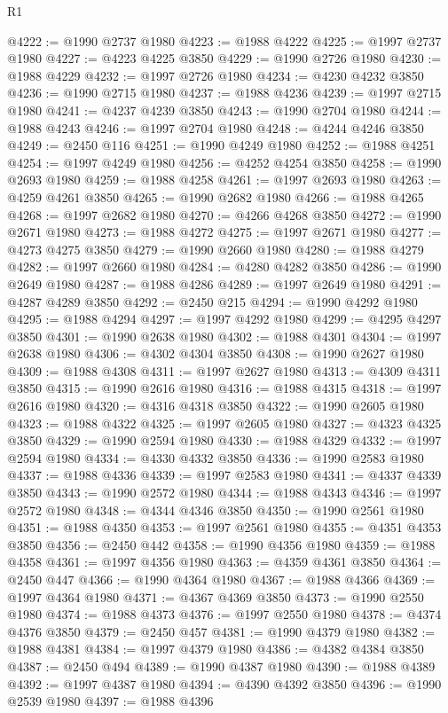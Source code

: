 \begin{lexlean}{R1}
\begin{coremodule}
@4222 := @1990 @2737 @1980
@4223 := @1988 @4222
@4225 := @1997 @2737 @1980
@4227 := @4223 @4225 @3850
@4229 := @1990 @2726 @1980
@4230 := @1988 @4229
@4232 := @1997 @2726 @1980
@4234 := @4230 @4232 @3850
@4236 := @1990 @2715 @1980
@4237 := @1988 @4236
@4239 := @1997 @2715 @1980
@4241 := @4237 @4239 @3850
@4243 := @1990 @2704 @1980
@4244 := @1988 @4243
@4246 := @1997 @2704 @1980
@4248 := @4244 @4246 @3850
@4249 := @2450 @116
@4251 := @1990 @4249 @1980
@4252 := @1988 @4251
@4254 := @1997 @4249 @1980
@4256 := @4252 @4254 @3850
@4258 := @1990 @2693 @1980
@4259 := @1988 @4258
@4261 := @1997 @2693 @1980
@4263 := @4259 @4261 @3850
@4265 := @1990 @2682 @1980
@4266 := @1988 @4265
@4268 := @1997 @2682 @1980
@4270 := @4266 @4268 @3850
@4272 := @1990 @2671 @1980
@4273 := @1988 @4272
@4275 := @1997 @2671 @1980
@4277 := @4273 @4275 @3850
@4279 := @1990 @2660 @1980
@4280 := @1988 @4279
@4282 := @1997 @2660 @1980
@4284 := @4280 @4282 @3850
@4286 := @1990 @2649 @1980
@4287 := @1988 @4286
@4289 := @1997 @2649 @1980
@4291 := @4287 @4289 @3850
@4292 := @2450 @215
@4294 := @1990 @4292 @1980
@4295 := @1988 @4294
@4297 := @1997 @4292 @1980
@4299 := @4295 @4297 @3850
@4301 := @1990 @2638 @1980
@4302 := @1988 @4301
@4304 := @1997 @2638 @1980
@4306 := @4302 @4304 @3850
@4308 := @1990 @2627 @1980
@4309 := @1988 @4308
@4311 := @1997 @2627 @1980
@4313 := @4309 @4311 @3850
@4315 := @1990 @2616 @1980
@4316 := @1988 @4315
@4318 := @1997 @2616 @1980
@4320 := @4316 @4318 @3850
@4322 := @1990 @2605 @1980
@4323 := @1988 @4322
@4325 := @1997 @2605 @1980
@4327 := @4323 @4325 @3850
@4329 := @1990 @2594 @1980
@4330 := @1988 @4329
@4332 := @1997 @2594 @1980
@4334 := @4330 @4332 @3850
@4336 := @1990 @2583 @1980
@4337 := @1988 @4336
@4339 := @1997 @2583 @1980
@4341 := @4337 @4339 @3850
@4343 := @1990 @2572 @1980
@4344 := @1988 @4343
@4346 := @1997 @2572 @1980
@4348 := @4344 @4346 @3850
@4350 := @1990 @2561 @1980
@4351 := @1988 @4350
@4353 := @1997 @2561 @1980
@4355 := @4351 @4353 @3850
@4356 := @2450 @442
@4358 := @1990 @4356 @1980
@4359 := @1988 @4358
@4361 := @1997 @4356 @1980
@4363 := @4359 @4361 @3850
@4364 := @2450 @447
@4366 := @1990 @4364 @1980
@4367 := @1988 @4366
@4369 := @1997 @4364 @1980
@4371 := @4367 @4369 @3850
@4373 := @1990 @2550 @1980
@4374 := @1988 @4373
@4376 := @1997 @2550 @1980
@4378 := @4374 @4376 @3850
@4379 := @2450 @457
@4381 := @1990 @4379 @1980
@4382 := @1988 @4381
@4384 := @1997 @4379 @1980
@4386 := @4382 @4384 @3850
@4387 := @2450 @494
@4389 := @1990 @4387 @1980
@4390 := @1988 @4389
@4392 := @1997 @4387 @1980
@4394 := @4390 @4392 @3850
@4396 := @1990 @2539 @1980
@4397 := @1988 @4396

\end{coremodule}
\end{lexlean}
